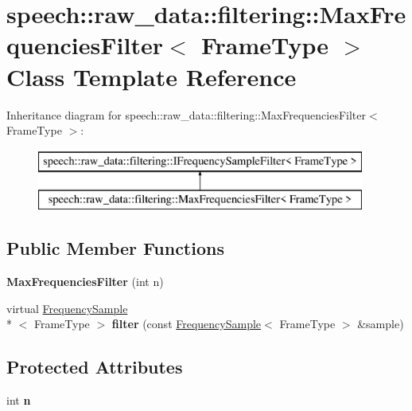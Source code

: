\hypertarget{classspeech_1_1raw__data_1_1filtering_1_1MaxFrequenciesFilter}{\section{speech\+:\+:raw\+\_\+data\+:\+:filtering\+:\+:Max\+Frequencies\+Filter$<$ Frame\+Type $>$ Class Template Reference}
\label{classspeech_1_1raw__data_1_1filtering_1_1MaxFrequenciesFilter}
}
Inheritance diagram for speech\+:\+:raw\+\_\+data\+:\+:filtering\+:\+:Max\+Frequencies\+Filter$<$ Frame\+Type $>$\+:\begin{figure}[H]
\begin{center}
\leavevmode
\includegraphics[height=2.000000cm]{classspeech_1_1raw__data_1_1filtering_1_1MaxFrequenciesFilter}
\end{center}
\end{figure}
\subsection*{Public Member Functions}
\begin{DoxyCompactItemize}
\item 
\hypertarget{classspeech_1_1raw__data_1_1filtering_1_1MaxFrequenciesFilter_a8f829010be02bb04a13ebdd99051887b}{{\bfseries Max\+Frequencies\+Filter} (int n)}\label{classspeech_1_1raw__data_1_1filtering_1_1MaxFrequenciesFilter_a8f829010be02bb04a13ebdd99051887b}

\item 
\hypertarget{classspeech_1_1raw__data_1_1filtering_1_1MaxFrequenciesFilter_a788c9b1a1476fd2b612b83cda4a09ff4}{virtual \hyperlink{classspeech_1_1raw__data_1_1FrequencySample}{Frequency\+Sample}\\*
$<$ Frame\+Type $>$ {\bfseries filter} (const \hyperlink{classspeech_1_1raw__data_1_1FrequencySample}{Frequency\+Sample}$<$ Frame\+Type $>$ \&sample)}\label{classspeech_1_1raw__data_1_1filtering_1_1MaxFrequenciesFilter_a788c9b1a1476fd2b612b83cda4a09ff4}

\end{DoxyCompactItemize}
\subsection*{Protected Attributes}
\begin{DoxyCompactItemize}
\item 
\hypertarget{classspeech_1_1raw__data_1_1filtering_1_1MaxFrequenciesFilter_a053feca5518f5e2c8f394f27c75e5163}{int {\bfseries n}}\label{classspeech_1_1raw__data_1_1filtering_1_1MaxFrequenciesFilter_a053feca5518f5e2c8f394f27c75e5163}

\end{DoxyCompactItemize}
